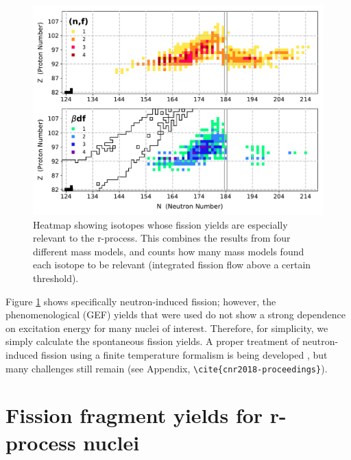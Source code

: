 \begin{figure}
	\centering
	\includegraphics[width=0.7\linewidth]{TeX_files/rProc_important-fissions}
	\caption[Isotopes whose fission yields are especially relevant to the r-process]{Heatmap showing isotopes whose fission yields are especially relevant to the r-process. This combines the results from four different mass models, and counts how many mass models found each isotope to be relevant (integrated fission flow above a certain threshold). \cite{Vassh2018}}
	\label{fig:rprocimportant-fissions}
\end{figure}

Figure \ref{fig:rprocimportant-fissions} shows specifically neutron-induced fission; however, the phenomenological (GEF) yields that were used do not show a strong dependence on excitation energy for many nuclei of interest. Therefore, for simplicity, we simply calculate the spontaneous fission yields. A proper treatment of neutron-induced fission using a finite temperature formalism is being developed \cite{Mcdonnell2014, Schunck2014, Schunck2015b}, but many challenges still remain (see Appendix, \verb|\cite{cnr2018-proceedings}|).


\section{Fission fragment yields for r-process nuclei}

